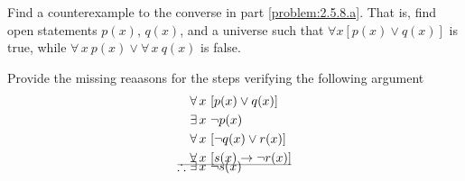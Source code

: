 \documentclass[a4paper, english, 12pt]{article} %
\begin{document}
\begin{subproblem}
  Find a counterexample to the converse in part \ref{problem:2.5.8.a}. That is,
  find open statements $p(x)$, $q(x)$, and a universe such that $\forall x [p(x)
  \vee q(x)]$ is true, while $\forall\,x \ p(x) \vee \forall \, x \ q(x)$ is false.
\end{subproblem}

\begin{problem}[10]
  Provide the missing reaasons for the steps verifying the following argument
  \begin{align*}
    & \forall\,x\ [p(x) \vee q(x)]\\
    & \exists \,x\ \neg p(x)\\ 
    & \forall \,x\ [\neg q(x) \vee r(x)]\\
    & \forall \,x \ [s(x) \to \neg r(x)] \\[-0.5cm]
    \cmidrule{1-2} \\[-1cm]
     \therefore \ & \exists \, x \ \neg s(x)
  \end{align*}
\end{problem}
\end{document}
